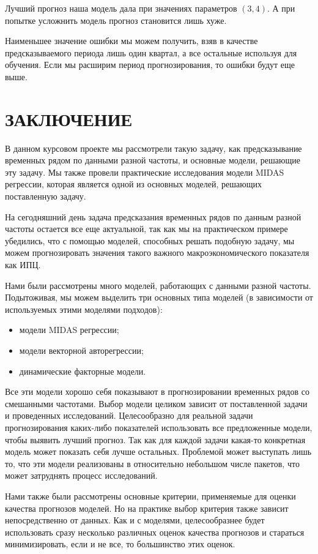 \documentclass[a4paper, 14pt]{extarticle}
\begin{document}
			Лучший прогноз наша модель дала при значениях параметров $(3,4)$. А при попытке усложнить модель прогноз становится лишь хуже. 
			
			Наименьшее значение ошибки мы можем получить, взяв в качестве предсказываемого периода лишь один квартал, а все остальные используя для обучения. Если мы расширим период прогнозирования, то ошибки будут еще выше.
	 \newpage
	\section{ЗАКЛЮЧЕНИЕ}
	В данном курсовом проекте мы рассмотрели такую задачу, как предсказывание временных рядом по данными разной частоты, и основные модели, решающие эту задачу. Мы также провели практические исследования модели MIDAS регрессии, которая является одной из основных моделей, решающих поставленную задачу.
	
	На сегодняшний день задача предсказания временных рядов по данным разной частоты остается все еще актуальной, так как мы на практическом примере убедились, что с помощью моделей, способных решать подобную задачу, мы можем прогнозировать значения такого важного макроэкономического показателя как ИПЦ.
	
	Нами были рассмотрены много моделей, работающих с данными разной частоты. Подытоживая, мы можем выделить три основных типа моделей (в зависимости от используемых этими моделями подходов):
	\begin{itemize}
		\item модели MIDAS регрессии;
		\item модели векторной авторегрессии;
		\item динамические факторные модели.
	\end{itemize}
	Все эти модели хорошо себя показывают в прогнозировании временных рядов со смешанными частотами. Выбор модели целиком зависит от поставленной задачи и проведенных исследований. Целесообразно для реальной задачи прогнозирования каких-либо показателей использовать все предложенные модели, чтобы выявить лучший прогноз. Так как для каждой задачи какая-то конкретная модель может показать себя лучше остальных. Проблемой может выступать лишь то, что эти модели реализованы в относительно небольшом числе пакетов, что может затруднять процесс исследований.
	
	Нами также были рассмотрены основные критерии, применяемые для оценки качества прогнозов моделей. Но на практике выбор критерия также зависит непосредственно от данных. Как и с моделями, целесообразнее будет использовать сразу несколько различных оценок качества прогнозов и стараться минимизировать, если и не все, то большинство этих оценок.
	
\end{document}

